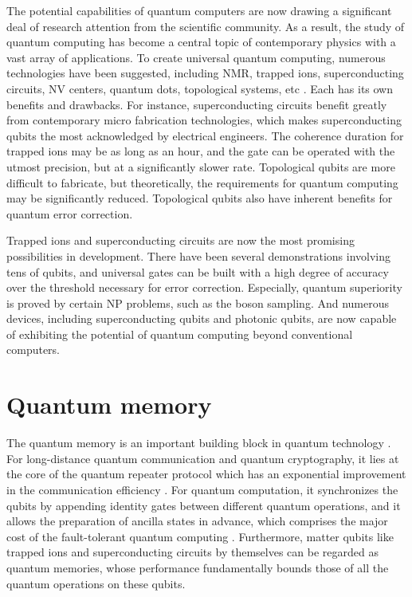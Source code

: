 The potential capabilities of quantum computers \cite{Benioff1980,Feynman1982} are now drawing a significant deal of research attention from the scientific community. As a result, the study of quantum computing has become a central topic of contemporary physics with a vast array of applications. To create universal quantum computing, numerous technologies have been suggested, including NMR, trapped ions, superconducting circuits, NV centers, quantum dots, topological systems, etc \cite{Ladd2010}. Each has its own benefits and drawbacks. For instance, superconducting circuits benefit greatly from contemporary micro fabrication technologies, which makes superconducting qubits the most acknowledged by electrical engineers. The coherence duration for trapped ions may be as long as an hour, and the gate can be operated with the utmost precision, but at a significantly slower rate. Topological qubits are more difficult to fabricate, but theoretically, the requirements for quantum computing may be significantly reduced. Topological qubits also have inherent benefits for quantum error correction.

Trapped ions and superconducting circuits are now the most promising possibilities in development. There have been several demonstrations involving tens of qubits, and universal gates can be built with a high degree of accuracy over the threshold necessary for error correction. Especially, quantum superiority is proved by certain NP problems, such as the boson sampling. And numerous devices, including superconducting qubits and photonic qubits, are now capable of exhibiting the potential of quantum computing beyond conventional computers.


\section{Quantum memory}

The quantum memory is an important building block in quantum technology \cite{lvovsky2009optical}. For long-distance quantum communication and quantum cryptography, it lies at the core of the quantum repeater protocol which has an exponential improvement in the communication efficiency \cite{duan2001long, sangouard2011quantum}. For quantum computation, it synchronizes the qubits by appending identity gates between different quantum operations, and it allows the preparation of ancilla states in advance, which comprises the major cost of the fault-tolerant quantum computing \cite{gottesman1998theory,campbell2017roads}. Furthermore, matter qubits like trapped ions and superconducting circuits \cite{huang2020superconducting} by themselves can be regarded as quantum memories, whose performance fundamentally bounds those of all the quantum operations on these qubits.

